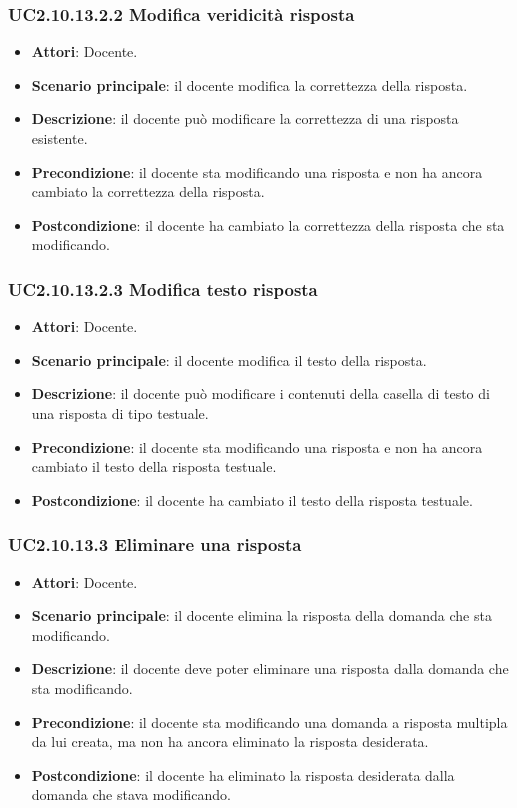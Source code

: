 \subsubsection{UC2.10.13.2.2 Modifica veridicità risposta}
\begin{itemize}
\item \textbf{Attori}: Docente.
\item \textbf{Scenario principale}: il docente modifica la correttezza della risposta.
\item \textbf{Descrizione}: il docente può modificare la correttezza di una risposta esistente.
\item \textbf{Precondizione}: il docente sta modificando una risposta e non ha ancora cambiato la correttezza della risposta.
\item \textbf{Postcondizione}: il docente ha cambiato la correttezza della risposta che sta modificando.
\end{itemize}
\subsubsection{UC2.10.13.2.3 Modifica testo risposta}
\begin{itemize}
\item \textbf{Attori}: Docente.
\item \textbf{Scenario principale}: il docente modifica il testo della risposta.
\item \textbf{Descrizione}: il docente può modificare i contenuti della casella di testo di una risposta di tipo testuale.
\item \textbf{Precondizione}: il docente sta modificando una risposta e non ha ancora cambiato il testo della risposta testuale.
\item \textbf{Postcondizione}: il docente ha cambiato il testo della risposta testuale.
\end{itemize}
\subsubsection{UC2.10.13.3 Eliminare una risposta}
\begin{itemize}
\item \textbf{Attori}: Docente.
\item \textbf{Scenario principale}: il docente elimina la risposta della domanda che sta modificando.
\item \textbf{Descrizione}: il docente deve poter eliminare una risposta dalla domanda che sta modificando.
\item \textbf{Precondizione}: il docente sta modificando una domanda a risposta multipla da lui creata, ma non ha ancora eliminato la risposta desiderata.
\item \textbf{Postcondizione}: il docente ha eliminato la risposta desiderata dalla domanda che stava modificando.
\end{itemize}
